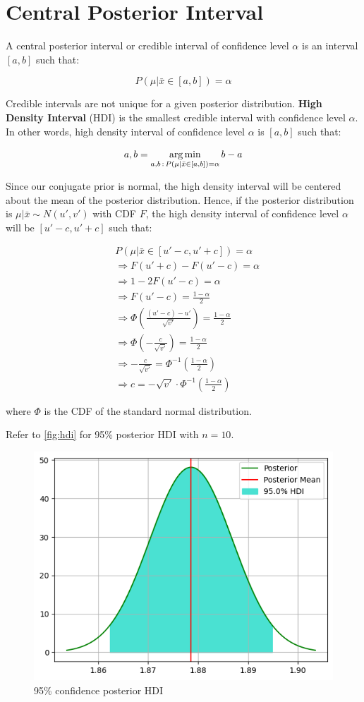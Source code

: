\section{Central Posterior Interval}

A central posterior interval or credible interval of confidence level $\alpha$ is an interval $[a, b]$ such that:

$$ P(\mu | \bar{x} \in [a, b]) = \alpha $$

Credible intervals are not unique for a given posterior distribution.
\textbf{High Density Interval} (HDI) is the smallest credible interval with confidence level $\alpha$.
In other words, high density interval of confidence level $\alpha$ is $[a, b]$ such that:

\[ a, b = \operatorname*{arg\,min}_{a, b \, : \, P(\mu | \bar{x} \in [a, b]) = \alpha} b - a \]

Since our conjugate prior is normal, the high density interval will be centered about the mean of the posterior distribution.
Hence, if the posterior distribution is $\mu | \bar{x} \sim N(u', v')$ with CDF $F$, the high density interval of confidence level $\alpha$ will be $[u' - c, u' + c]$ such that:

\begin{align*}
  &P(\mu |\bar{x} \in [u' - c, u' + c]) = \alpha \\
  &\Rightarrow F(u' + c) - F(u' - c) = \alpha \\
  &\Rightarrow 1 - 2F(u' - c) = \alpha \\
  &\Rightarrow F(u' - c) = \frac{1 - \alpha}{2} \\
  &\Rightarrow \Phi(\frac{(u' - c) - u'}{\sqrt{v'}}) = \frac{1 - \alpha}{2} \\
  &\Rightarrow \Phi(-\frac{c}{\sqrt{v'}}) = \frac{1 - \alpha}{2} \\
  &\Rightarrow -\frac{c}{\sqrt{v'}} = \Phi^{-1}\left(\frac{1 - \alpha}{2}\right) \\
  &\Rightarrow c = -\sqrt{v'} \cdot \Phi^{-1}\left(\frac{1 - \alpha}{2}\right)
\end{align*}

\noindent where $\Phi$ is the CDF of the standard normal distribution.

Refer to \autoref{fig:hdi} for 95\% posterior HDI with $n = 10$.

\begin{figure}
  \centering
  \includegraphics[width=.6\linewidth]{images/hdi.png}
  \caption{95\% confidence posterior HDI}
  \label{fig:hdi}
\end{figure}
